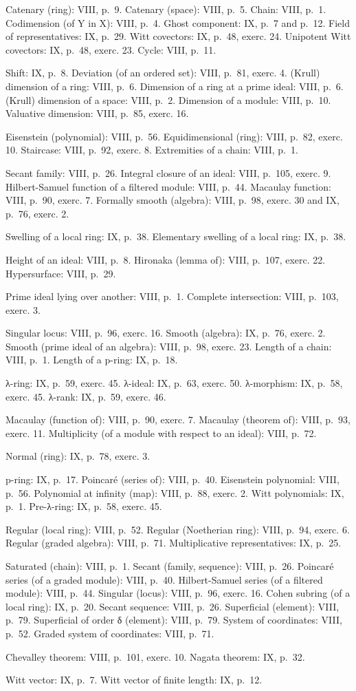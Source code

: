 Catenary (ring): VIII, p.~9. Catenary (space): VIII, p.~5. Chain: VIII, p.~1. Codimension (of Y in X): VIII, p.~4. Ghost component: IX, p.~7 and p.~12. Field of representatives: IX, p.~29. Witt covectors: IX, p.~48, exerc. 24. Unipotent Witt covectors: IX, p.~48, exerc. 23. Cycle: VIII, p.~11.

Shift: IX, p.~8. Deviation (of an ordered set): VIII, p.~81, exerc. 4. (Krull) dimension of a ring: VIII, p.~6. Dimension of a ring at a prime ideal: VIII, p.~6. (Krull) dimension of a space: VIII, p.~2. Dimension of a module: VIII, p.~10. Valuative dimension: VIII, p.~85, exerc. 16.

Eisenstein (polynomial): VIII, p.~56. Equidimensional (ring): VIII, p.~82, exerc. 10. Staircase: VIII, p.~92, exerc. 8. Extremities of a chain: VIII, p.~1.

Secant family: VIII, p.~26. Integral closure of an ideal: VIII, p.~105, exerc. 9. Hilbert-Samuel function of a filtered module: VIII, p.~44. Macaulay function: VIII, p.~90, exerc. 7. Formally smooth (algebra): VIII, p.~98, exerc. 30 and IX, p.~76, exerc. 2.

Swelling of a local ring: IX, p.~38. Elementary swelling of a local ring: IX, p.~38.

Height of an ideal: VIII, p.~8. Hironaka (lemma of): VIII, p.~107, exerc. 22. Hypersurface: VIII, p.~29.

Prime ideal lying over another: VIII, p.~1. Complete intersection: VIII, p.~103, exerc. 3.

Singular locus: VIII, p.~96, exerc. 16. Smooth (algebra): IX, p.~76, exerc. 2. Smooth (prime ideal of an algebra): VIII, p.~98, exerc. 23. Length of a chain: VIII, p.~1. Length of a p-ring: IX, p.~18.

λ-ring: IX, p.~59, exerc. 45. λ-ideal: IX, p.~63, exerc. 50. λ-morphism: IX, p.~58, exerc. 45. λ-rank: IX, p.~59, exerc. 46.

Macaulay (function of): VIII, p.~90, exerc. 7. Macaulay (theorem of): VIII, p.~93, exerc. 11. Multiplicity (of a module with respect to an ideal): VIII, p.~72.

Normal (ring): IX, p.~78, exerc. 3.

p-ring: IX, p.~17. Poincaré (series of): VIII, p.~40. Eisenstein polynomial: VIII, p.~56. Polynomial at infinity (map): VIII, p.~88, exerc. 2. Witt polynomials: IX, p.~1. Pre-λ-ring: IX, p.~58, exerc. 45.

Regular (local ring): VIII, p.~52. Regular (Noetherian ring): VIII, p.~94, exerc. 6. Regular (graded algebra): VIII, p.~71. Multiplicative representatives: IX, p.~25.

Saturated (chain): VIII, p.~1. Secant (family, sequence): VIII, p.~26. Poincaré series (of a graded module): VIII, p.~40. Hilbert-Samuel series (of a filtered module): VIII, p.~44. Singular (locus): VIII, p.~96, exerc. 16. Cohen subring (of a local ring): IX, p.~20. Secant sequence: VIII, p.~26. Superficial (element): VIII, p.~79. Superficial of order δ (element): VIII, p.~79. System of coordinates: VIII, p.~52. Graded system of coordinates: VIII, p.~71.

Chevalley theorem: VIII, p.~101, exerc. 10. Nagata theorem: IX, p.~32.

Witt vector: IX, p.~7. Witt vector of finite length: IX, p.~12.
